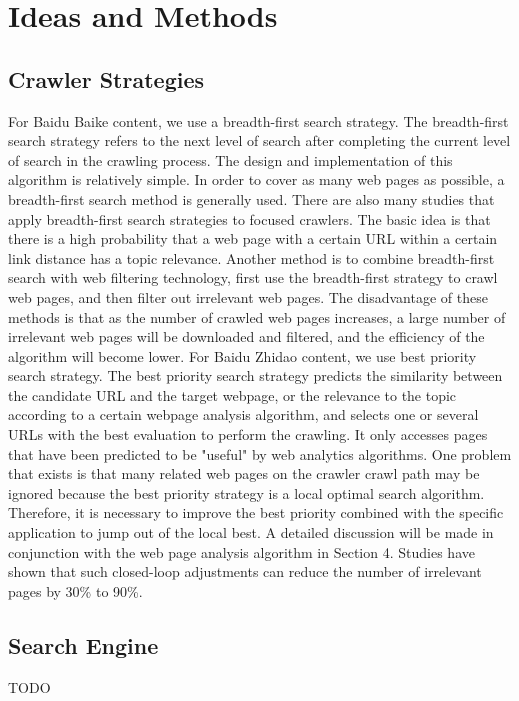 \documentclass[10pt,times,twocolumn]{article}
\begin{document}
\section{Ideas and Methods}

\subsection{Crawler Strategies}
For Baidu Baike content, we use a breadth-first search strategy. The breadth-first search strategy refers to the next level of search after completing the current level of search in the crawling process. The design and implementation of this algorithm is relatively simple. In order to cover as many web pages as possible, a breadth-first search method is generally used. There are also many studies that apply breadth-first search strategies to focused crawlers. The basic idea is that there is a high probability that a web page with a certain URL within a certain link distance has a topic relevance. Another method is to combine breadth-first search with web filtering technology, first use the breadth-first strategy to crawl web pages, and then filter out irrelevant web pages. The disadvantage of these methods is that as the number of crawled web pages increases, a large number of irrelevant web pages will be downloaded and filtered, and the efficiency of the algorithm will become lower.
\newline
For Baidu Zhidao content, we use best priority search strategy. The best priority search strategy predicts the similarity between the candidate URL and the target webpage, or the relevance to the topic according to a certain webpage analysis algorithm, and selects one or several URLs with the best evaluation to perform the crawling. It only accesses pages that have been predicted to be "useful" by web analytics algorithms. One problem that exists is that many related web pages on the crawler crawl path may be ignored because the best priority strategy is a local optimal search algorithm. Therefore, it is necessary to improve the best priority combined with the specific application to jump out of the local best. A detailed discussion will be made in conjunction with the web page analysis algorithm in Section 4. Studies have shown that such closed-loop adjustments can reduce the number of irrelevant pages by 30\% to 90\%.

\subsection{Search Engine}
TODO
\end{document}
